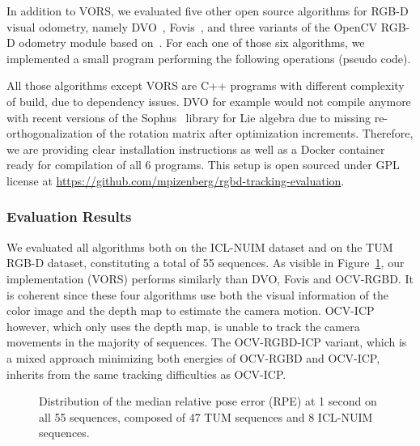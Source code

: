 In addition to VORS, we evaluated five other open source algorithms for RGB-D visual odometry,
namely DVO~\cite{kerl2013robust}, Fovis~\cite{huang2017visual},
and three variants of the OpenCV RGB-D odometry module
based on~\cite{newcombe2011kinectfusion, steinbrucker2011real}.
For each one of those six algorithms, we implemented a small program
performing the following operations (pseudo code).

All those algorithms except VORS are C++ programs with different complexity of build,
due to dependency issues.
DVO for example would not compile anymore with recent versions of
the Sophus~\cite{sophus} library for Lie algebra
due to missing re-orthogonalization of the rotation matrix after optimization increments.
Therefore, we are providing clear installation instructions as well as
a Docker container ready for compilation of all 6 programs.
This setup is open sourced under GPL license
at \url{https://github.com/mpizenberg/rgbd-tracking-evaluation}.

\subsubsection{Evaluation Results}%
\label{ssub:eval_results}

We evaluated all algorithms both on the ICL-NUIM dataset and on the TUM RGB-D dataset,
constituting a total of 55 sequences.
As visible in Figure~\ref{fig:rpe_median_all},
our implementation (VORS) performs similarly than DVO, Fovis and OCV-RGBD.
It is coherent since these four algorithms use both the visual information of the color image
and the depth map to estimate the camera motion.
OCV-ICP however, which only uses the depth map,
is unable to track the camera movements in the majority of sequences.
The OCV-RGBD-ICP variant, which is a mixed approach minimizing both energies
of OCV-RGBD and OCV-ICP, inherits from the same tracking difficulties as OCV-ICP.\@

\begin{figure}[ht]
	\centering
	
	\caption{Distribution of the median relative pose error (RPE) at 1 second on all 55 sequences,
	composed of 47 TUM sequences and 8 ICL-NUIM sequences.}%
	\label{fig:rpe_median_all}
\end{figure}

